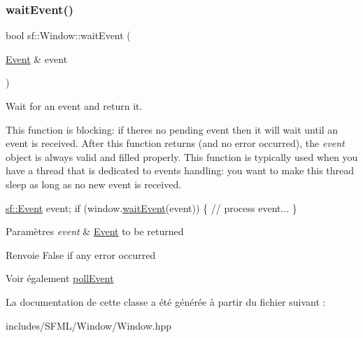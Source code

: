 \subsubsection{\texorpdfstring{wait\+Event()}{waitEvent()}}
{\footnotesize\ttfamily bool sf\+::\+Window\+::wait\+Event (\begin{DoxyParamCaption}\item[{\hyperlink{classsf_1_1Event}{Event} \&}]{event }\end{DoxyParamCaption})}



Wait for an event and return it. 

This function is blocking\+: if there\textquotesingle{}s no pending event then it will wait until an event is received. After this function returns (and no error occurred), the {\itshape event} object is always valid and filled properly. This function is typically used when you have a thread that is dedicated to events handling\+: you want to make this thread sleep as long as no new event is received. 
\begin{DoxyCode}
\hyperlink{classsf_1_1Event}{sf::Event} event;
\textcolor{keywordflow}{if} (window.\hyperlink{classsf_1_1Window_aaf02ab64fbc1d374eef3696df54137bc}{waitEvent}(event))
\{
   \textcolor{comment}{// process event...}
\}
\end{DoxyCode}



\begin{DoxyParams}{Paramètres}
{\em event} & \hyperlink{classsf_1_1Event}{Event} to be returned\\
\hline
\end{DoxyParams}
\begin{DoxyReturn}{Renvoie}
False if any error occurred
\end{DoxyReturn}
\begin{DoxySeeAlso}{Voir également}
\hyperlink{classsf_1_1Window_a338e996585faf82e93069858e3b531b7}{poll\+Event} 
\end{DoxySeeAlso}


La documentation de cette classe a été générée à partir du fichier suivant \+:\begin{DoxyCompactItemize}
\item 
includes/\+S\+F\+M\+L/\+Window/Window.\+hpp\end{DoxyCompactItemize}
